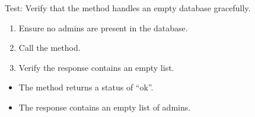 \documentclass[letterpaper,10pt,english]{sphinxmanual}
\begin{document}
\begin{fulllineitems}
\label{\detokenize{test:test.test_admin.test_list_admins_empty}}
\pysigstartsignatures
\pysiglinewithargsret
{}
{}
{}
\pysigstopsignatures
\sphinxAtStartPar
Test: Verify that the method handles an empty database gracefully.
\begin{description}
\begin{enumerate}
%
\item {} 
\sphinxAtStartPar
Ensure no admins are present in the database.

\item {} 
\sphinxAtStartPar
Call the  method.

\item {} 
\sphinxAtStartPar
Verify the response contains an empty list.

\end{enumerate}

\begin{itemize}
\item {} 
\sphinxAtStartPar
The method returns a status of “ok”.

\item {} 
\sphinxAtStartPar
The response contains an empty list of admins.

\end{itemize}

\end{description}

\end{fulllineitems}

\end{document}
